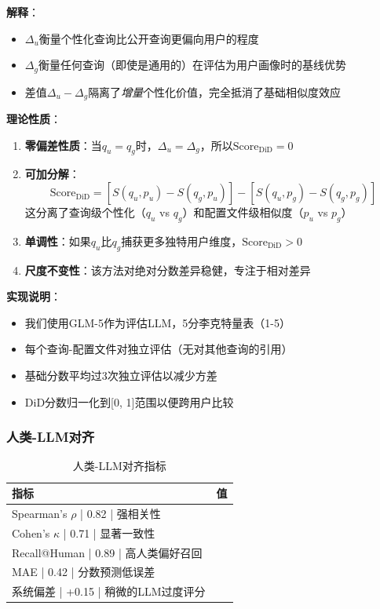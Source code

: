 \documentclass[11pt,a4paper]{article}
\begin{document}
\textbf{解释}：
\begin{itemize}
    \item $\Delta_u$衡量个性化查询比公开查询更偏向用户的程度
    \item $\Delta_g$衡量任何查询（即使是通用的）在评估为用户画像时的基线优势
    \item 差值$\Delta_u - \Delta_g$隔离了\textit{增量}个性化价值，完全抵消了基础相似度效应
\end{itemize}

\textbf{理论性质}：
\begin{enumerate}
    \item \textbf{零偏差性质}：当$q_u = q_g$时，$\Delta_u = \Delta_g$，所以$\text{Score}_{\text{DiD}} = 0$
    \item \textbf{可加分解}：
    $$\text{Score}_{\text{DiD}} = [S(q_u, p_u) - S(q_g, p_u)] - [S(q_u, p_g) - S(q_g, p_g)]$$
    这分离了查询级个性化（$q_u$ vs $q_g$）和配置文件级相似度（$p_u$ vs $p_g$）
    \item \textbf{单调性}：如果$q_u$比$q_g$捕获更多独特用户维度，$\text{Score}_{\text{DiD}} > 0$
    \item \textbf{尺度不变性}：该方法对绝对分数差异稳健，专注于相对差异
\end{enumerate}

\textbf{实现说明}：
\begin{itemize}
    \item 我们使用GLM-5作为评估LLM，5分李克特量表（1-5）
    \item 每个查询-配置文件对独立评估（无对其他查询的引用）
    \item 基础分数平均过3次独立评估以减少方差
    \item DiD分数归一化到[0, 1]范围以便跨用户比较
\end{itemize}

\subsubsection{人类-LLM对齐}

\begin{table}[h]
\centering
\begin{tabular}{lc}
\toprule
\textbf{指标} & \textbf{值} \\
\midrule
Spearman's $\rho$ | 0.82 | 强相关性 \\
Cohen's $\kappa$ | 0.71 | 显著一致性 \\
Recall@Human | 0.89 | 高人类偏好召回 \\
MAE | 0.42 | 分数预测低误差 \\
系统偏差 | +0.15 | 稍微的LLM过度评分 \\
\bottomrule
\end{tabular}
\caption{人类-LLM对齐指标}
\label{tab:human_llm}
\end{table}
\end{document}
